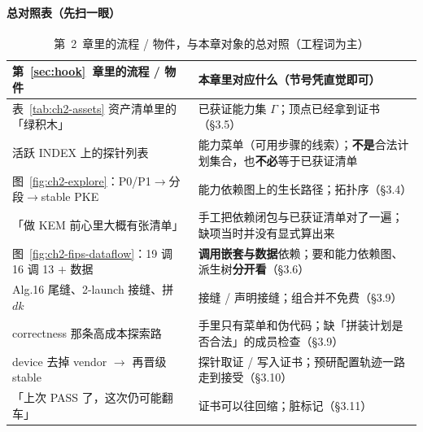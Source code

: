 \documentclass[UTF8,a4paper,11pt]{ctexart}
\theoremstyle{definition}
\theoremstyle{plain}
\theoremstyle{remark}
\numberwithin{figure}{section}
\numberwithin{table}{section}
\begin{document}
\paragraph{总对照表（先扫一眼）}
\begin{table}[H]
\centering\small
\caption{第~2~章里的流程 / 物件，与本章对象的总对照（工程词为主）}
\label{tab:ch312-overview}
\begin{tabular}{@{}L{5.0cm}L{8.8cm}@{}}
  \toprule
  第~\ref{sec:hook}~章里的流程 / 物件 & 本章里对应什么（节号凭直觉即可） \\
  \midrule
  表~\ref{tab:ch2-assets} 资产清单里的「绿积木」 & 已获证能力集 $\Gamma$；顶点已经拿到证书（§3.5） \\
  活跃 INDEX 上的探针列表 & 能力菜单（可用步骤的线索）；\textbf{不是}合法计划集合，也\textbf{不必}等于已获证清单 \\
  图~\ref{fig:ch2-explore}：P0/P1$\to$分段$\to$stable PKE & 能力依赖图上的生长路径；拓扑序（§3.4） \\
  「做 KEM 前心里大概有张清单」 & 手工把依赖闭包与已获证清单对了一遍；缺项当时并没有显式算出来 \\
  图~\ref{fig:ch2-fips-dataflow}：19 调 16 调 13 $+$ 数据 & \textbf{调用嵌套与数据}依赖；要和能力依赖图、派生树\textbf{分开看}（§3.6） \\
  Alg.16 尾缝、2-launch 接缝、拼 $\mathit{dk}$ & 接缝 / 声明接缝；组合并不免费（§3.9） \\
  correctness 那条高成本探索路 & 手里只有菜单和伪代码；缺「拼装计划是否合法」的成员检查（§3.9） \\
  device 去掉 vendor $\to$ 再晋级 stable & 探针取证 / 写入证书；预研配置轨迹一路走到接受（§3.10） \\
  「上次 PASS 了，这次仍可能翻车」 & 证书可以往回缩；脏标记（§3.11） \\
  \bottomrule
\end{tabular}
\end{table}
\end{document}
